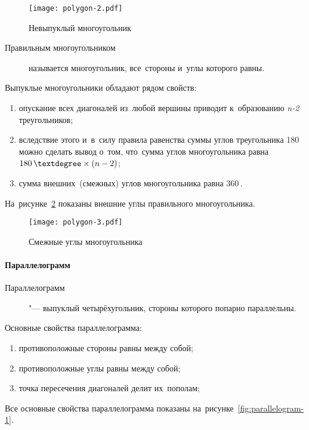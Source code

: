 \documentclass[]{scrartcl}
\begin{document}
\begin{figure}[ht]
\centering %
\texttt{[image: polygon-2.pdf]}
\caption{Невыпуклый многоугольник}\label{fig:polygon-2}
\end{figure} 

\begin{description}
	\item[Правильным многоугольником] называется многоугольник, все~стороны и~углы которого равны.
\end{description} 

Выпуклые многоугольники обладают рядом свойств:
\begin{enumerate}
	\item опускание всех диагоналей из~любой вершины приводит к~образованию \textit{n-2} треугольников;
	\item вследствие этого и~в~силу правила равенства суммы углов треугольника 180\,\textdegree можно сделать вывод о~том, что~сумма углов многоугольника равна $180\,\textdegree \times (n-2)$;
	\item сумма внешних~(смежных) углов многоугольника равна 360\,\textdegree.
\end{enumerate}  
На~рисунке~\ref{fig:polygon-3} показаны внешние углы правильного многоугольника.
\begin{figure}[ht]
	\centering %
	\texttt{[image: polygon-3.pdf]}
	\caption{Смежные углы многоугольника}\label{fig:polygon-3}
\end{figure}

\paragraph{Параллелограмм}
\begin{description}
	\item[Параллелограмм] "--- выпуклый четырёхугольник, стороны которого попарно параллельны.
\end{description} 
Основные свойства параллелограмма:
\begin{enumerate}
	\item противоположные стороны равны между собой;
	\item противоположные углы равны между собой;
	\item точка пересечения диагоналей делит их~пополам;
	\end{enumerate}
Все основные свойства параллелограмма показаны на~рисунке~\ref{fig:parallelogram-1}.
\end{document}
